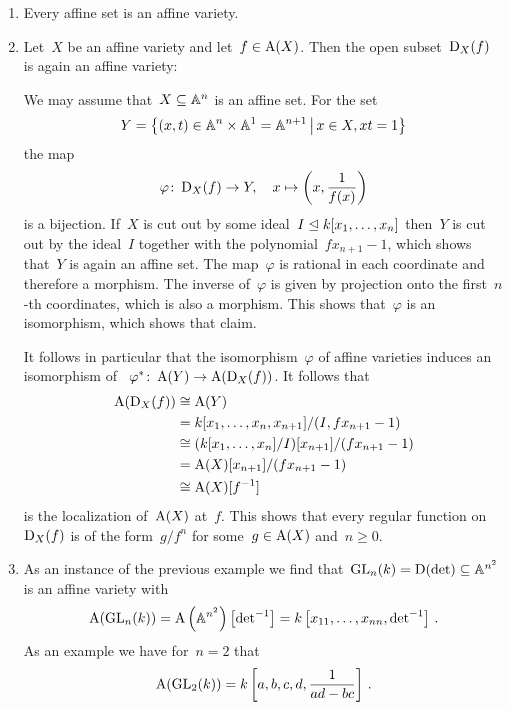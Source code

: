 \begin{example}
  \leavevmode
  \begin{enumerate}
    \item
      Every affine set is an affine variety.
    \item
      Let~$X$ be an affine variety and let~$f \in \operatorname{A}(X)$.
      Then the open subset~$\operatorname{D}_X(f)$ is again an affine variety:
      
      We may assume that~$X \subseteq \mathbb{A}^n$ is an affine set.
      For the set
      \[
          Y
        = \left\{
                (x, t)
            \in \Aff^n \times \Aff^1
            =   \Aff^{n+1}
          \suchthat*
            x \in X,
            x t = 1
          \right\}
      \]
      the map
      \[
                \varphi
        \colon  \operatorname{D}_X(f)
        \to     Y,
        \quad   x
        \mapsto \left( x, \frac{1}{f(x)} \right)
      \]
      is a bijection.
      If~$X$ is cut out by some ideal~$I \trianglelefteq k[x_1, \dotsc, x_n]$ then~$Y$ is cut out by the ideal~$I$ together with the polynomial~$f x_{n+1} - 1$, which shows that~$Y$ is again an affine set.
      The map~$\varphi$ is rational in each coordinate and therefore a morphism.
      The inverse of~$\varphi$ is given by projection onto the first~$n$-th coordinates, which is also a morphism.
      This shows that~$\varphi$ is an isomorphism, which shows that claim.
      
      It follows in particular that the isomorphism~$\varphi$ of affine varieties induces an isomorphism of ~$\varphi^* \colon \operatorname{A}(Y) \to \operatorname{A}(\operatorname{D}_X(f))$.
      It follows that
      \begin{align*}
                \operatorname{A}(\operatorname{D}_X(f))
        &\cong  \operatorname{A}(Y) \\
        &=      k[x_1, \dotsc, x_n, x_{n+1}]/(I, f x_{n+1} - 1) \\
        &\cong  ( k[x_1, \dotsc, x_n]/I )[x_{n+1}]/(f x_{n+1} - 1) \\
        &=      \operatorname{A}(X)[x_{n+1}]/(f x_{n+1} - 1) \\
        &\cong  \operatorname{A}(X)[f^{-1}]
      \end{align*}
      is the localization of~$\operatorname{A}(X)$ at~$f$.
      This shows that every regular function on~$\operatorname{D}_X(f)$ is of the form~$g/f^n$ for some~$g \in \operatorname{A}(X)$ and~$n \geq 0$.
    \item
      As an instance of the previous example we find that~$\operatorname{GL}_n(k) = \operatorname{D}(\det) \subseteq \mathbb{A}^{n^2}$ is an affine variety with
      \[
          \operatorname{A}(\operatorname{GL}_n(k))
        = \operatorname{A}\left( \mathbb{A}^{n^2} \right)\left[ {\det}^{-1} \right]
        = k\left[ x_{11}, \dotsc, x_{nn}, {\det}^{-1} \right] \,.
      \]
      As an example we have for~$n = 2$ that
      \[
          \operatorname{A}(\operatorname{GL}_2(k))
        = k\left[a, b, c, d, \frac{1}{ad-bc}\right] \,.
      \]
  \end{enumerate}
\end{example}


